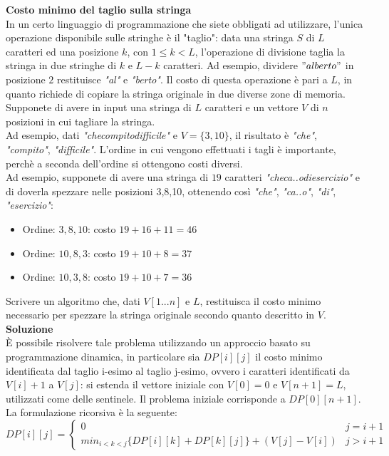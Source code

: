 \documentclass[../cheatSheetAlgoritmi.tex]{subfiles}
\begin{document}
\textbf{Costo minimo del taglio sulla stringa} \\
In un certo linguaggio di programmazione che siete obbligati ad utilizzare, l'unica operazione disponibile sulle stringhe è il "taglio": data una stringa $S$ di $L$ caratteri ed una posizione $k$, con $1 \leq k < L$, l'operazione di divisione taglia la stringa in due stringhe di $k$ e $L - k$ caratteri. Ad esempio, dividere $"alberto"$ in posizione $2$ restituisce \emph{"al"} e \emph{"berto"}. 
Il costo di questa operazione è pari a $L$, in quanto richiede di copiare la stringa originale in due diverse zone di memoria. \\
Supponete di avere in input una stringa di $L$ caratteri e un vettore $V$ di $n$ posizioni in cui tagliare la stringa.  \\
Ad esempio, dati \emph{"checompitodifficile"} e $V=\{3,10\}$, il risultato è \emph{"che"}, \emph{"compito"}, \emph{"difficile"}. L'ordine in cui vengono effettuati i tagli è importante, perchè a seconda dell’ordine si ottengono costi diversi.  \\
Ad esempio, supponete di avere una stringa di $19$ caratteri \emph{"checa..odiesercizio"} e di doverla spezzare nelle posizioni 3,8,10, ottenendo così \emph{"che"}, \emph{"ca..o"}, \emph{"di"}, \emph{"esercizio"}:
\begin{itemize}
	\item Ordine: $3, 8, 10$: costo $19 + 16 + 11 = 46$
	\item Ordine: $10, 8, 3$: costo $19 + 10 + 8 = 37$
	\item Ordine: $10, 3, 8$: costo $19 + 10 + 7 = 36$
\end{itemize}
Scrivere un algoritmo che, dati $V[1. . . n]$ e $L$, restituisca il costo minimo necessario per spezzare la stringa originale secondo quanto descritto in $V$. \\
\textbf{Soluzione} \\
È possibile risolvere tale problema utilizzando un approccio basato su programmazione dinamica, in particolare sia $DP[i][j]$ il costo minimo identificata dal taglio i-esimo al taglio j-esimo, ovvero i caratteri identificati da $V[i] + 1$ a $V[j]$: si estenda il vettore iniziale con $V[0] = 0$ e $V[n + 1] = L$, utilizzati come delle sentinele. Il problema iniziale corrisponde a $DP[0][n + 1]$. \\
La formulazione ricorsiva è la seguente: 
\begin{equation*}
  	DP[i][j] =\begin{cases}
  		0 & \text{$j = i + 1$} \\
    	min_{i < k < j}\{DP[i][k] + DP[k][j]\} + (V[j] - V[i]) & \text{$j > i + 1$}
  	\end{cases}
\end{equation*}
\end{document}
